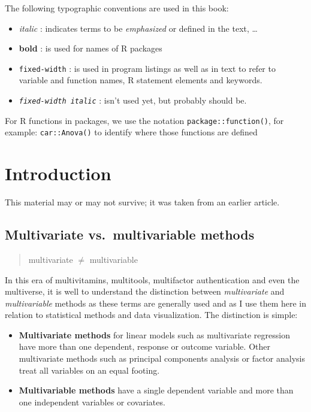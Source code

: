 \documentclass[
  letterpaper,
  10pt,
  krantz2]{krantz}
\begin{document}

The following typographic conventions are used in this book:

\begin{itemize}
\item
  \emph{italic} : indicates terms to be \emph{emphasized} or defined in
  the text, \ldots{}
\item
  \textbf{bold} : is used for names of R packages
\item
  \texttt{fixed-width} : is used in program listings as well as in text
  to refer to variable and function names, R statement elements and
  keywords.
\item
  \emph{\texttt{fixed-width\ italic}} : isn't used yet, but probably
  should be.
\end{itemize}

For R functions in packages, we use the notation
\texttt{package::function()}, for example: \texttt{car::Anova()} to
identify where those functions are defined

\mainmatter


\hypertarget{sec-introduction}{%
\chapter{Introduction}\label{sec-introduction}}

This material may or may not survive; it was taken from an earlier
article.

\hypertarget{multivariate-vs.-multivariable-methods}{%
\section{Multivariate vs.~multivariable
methods}\label{multivariate-vs.-multivariable-methods}}

\begin{quote}
multivariate \(\ne\) multivariable
\end{quote}

In this era of multivitamins, multitools, multifactor authentication and
even the multiverse, it is well to understand the distinction between
\emph{multivariate} and \emph{multivariable} methods as these terms are
generally used and as I use them here in relation to statistical methods
and data visualization. The distinction is simple:

\begin{itemize}
\item
  \textbf{Multivariate methods} for linear models such as multivariate
  regression have more than one dependent, response or outcome variable.
  Other multivariate methods such as principal components analysis or
  factor analysis treat all variables on an equal footing.
\item
  \textbf{Multivariable methods} have a single dependent variable and
  more than one independent variables or covariates.
\end{itemize}
\end{document}
